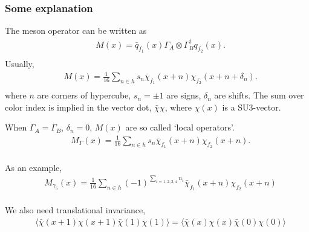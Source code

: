 \subsubsection{\label{sec:SomeExplanation}Some explanation}

The meson operator can be written as
\begin{equation}
\begin{split}
&M(x)=\bar{q}_{f_1}(x) \Gamma _A \otimes \Gamma _B^{\dagger} q_{f_2}(x).\\
\end{split}
\end{equation}
Usually,
\begin{equation}
\begin{split}
&M(x)=\frac{1}{16}\sum _{n\in h}s_n\bar{\chi}_{f_1}(x+n) \chi_{f_2}(x+n+\delta _ n).\\
\end{split}
\end{equation}
where $n$ are corners of hypercube, $s_n=\pm 1$ are signs, $\delta _n$ are shifts.
The sum over color index is implied in the vector dot, $\bar{\chi} \chi$, where $\chi(x)$ is a SU3-vector.

When $\Gamma _A = \Gamma _B$, $\delta _n = 0$, $M(x)$ are so called `local operators'.
\begin{equation}
\begin{split}
&M_{\Gamma}(x)=\frac{1}{16}\sum _{n\in h}s_n\bar{\chi}_{f_1}(x+n) \chi_{f_2}(x+n).\\
\end{split}
\end{equation}

As an example,
\begin{equation}
\begin{split}
&M_{\gamma_5}(x)=\frac{1}{16}\sum _{n\in h} (-1)^{\sum _{i=1,2,3,4} n_i}\bar{\chi}_{f_1}(x+n) \chi_{f_2}(x+n)\\
\end{split}
\end{equation}

We also need translational invariance, %
\begin{equation}
\begin{split}
&\langle \bar{\chi}(x+1)\chi(x+1) \bar{\chi}(1)\chi(1)\rangle = \langle \bar{\chi}(x)\chi(x)\bar{\chi}(0)\chi(0) \rangle
\end{split}
\end{equation}

